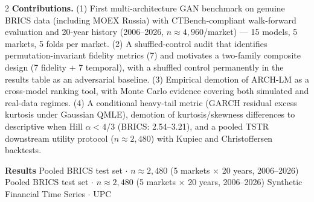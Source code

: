 \documentclass[10pt]{article}
\newcommand{\pagehead}[2]{%
  \begin{tcolorbox}[enhanced,arc=0pt,outer arc=0pt,boxrule=0pt,
    colback=Navy,colframe=Navy,
    top=5pt,bottom=5pt,left=8pt,right=8pt,
    before skip=0pt,after skip=10pt]
  {\color{white}\large\bfseries #1}%
  \ifx\relax#2\relax\else\\[1pt]{\color{blue!30!white}\small #2}\fi
  \hfill{\color{blue!20!white}\footnotesize Synthetic Financial Time Series $\cdot$ UPC}
  \end{tcolorbox}}
\begin{document}
\begin{multicols}{2}
\textbf{Contributions.} (1) First multi-architecture GAN benchmark on genuine BRICS data (including MOEX Russia) with CTBench-compliant walk-forward evaluation and 20-year history (2006--2026, $n\approx4{,}960$/market) --- 15 models, 5 markets, 5 folds per market. (2) A shuffled-control audit that identifies permutation-invariant fidelity metrics (7) and motivates a two-family composite design (7 fidelity + 7 temporal), with a shuffled control permanently in the results table as an adversarial baseline. (3) Empirical demotion of ARCH-LM as a cross-model ranking tool, with Monte Carlo evidence covering both simulated and real-data regimes. (4) A conditional heavy-tail metric (GARCH residual excess kurtosis under Gaussian QMLE), demotion of kurtosis/skewness differences to descriptive when Hill $\hat{\alpha} < 4$/$3$ (BRICS: 2.54--3.21), and a pooled TSTR downstream utility protocol ($n\approx2{,}480$) with Kupiec and Christoffersen backtests.

\end{multicols}

\clearpage

\pagehead{Results}
         {Pooled BRICS test set $\cdot$ $n\approx2{,}480$ (5 markets $\times$ 20 years, 2006--2026)}
\end{document}
